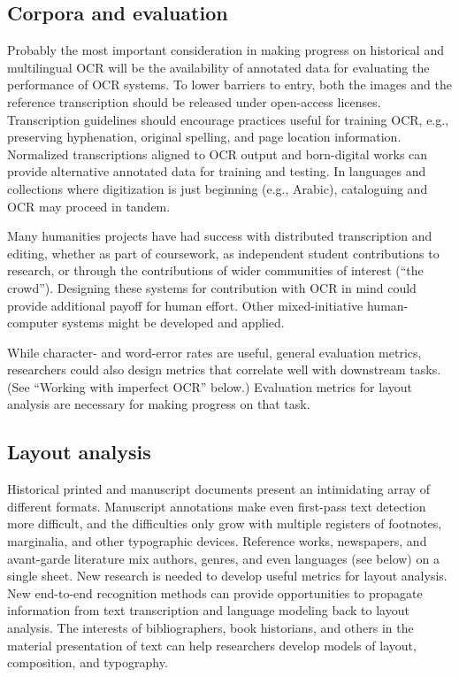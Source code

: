 \documentclass[twoside,11pt]{report}
\begin{document}
\subsection{Corpora and evaluation}

Probably the most important consideration in making progress on historical and multilingual OCR will be the availability of annotated data for evaluating the performance of OCR systems. To lower barriers to entry, both the images and the reference transcription should be released  under open-access licenses. Transcription guidelines should encourage practices useful for training OCR, e.g., preserving hyphenation, original spelling, and page location information. Normalized transcriptions aligned to OCR output and born-digital works can provide alternative annotated data for training and testing. In languages and collections where digitization is just beginning (e.g., Arabic), cataloguing and OCR may proceed in tandem.

Many humanities projects have had success with distributed transcription and editing, whether as part of coursework, as independent student contributions to research, or through the contributions of wider communities of interest (``the crowd''). Designing these systems for contribution with OCR in mind could provide additional payoff for human effort. Other mixed-initiative human-computer systems might be developed and applied.

While character- and word-error rates are useful, general evaluation metrics, researchers could also design metrics that correlate well with downstream tasks. (See ``Working with imperfect OCR'' below.) Evaluation metrics for layout analysis are necessary for making progress on that task.

\subsection{Layout analysis}

Historical printed and manuscript documents present an intimidating array of different formats. Manuscript annotations make even first-pass text detection more difficult, and the difficulties only grow with multiple registers of footnotes, marginalia, and other typographic devices. Reference works, newspapers, and avant-garde literature mix authors, genres, and even languages (see below) on a single sheet. New research is needed to develop useful metrics for layout analysis. New end-to-end recognition methods can provide opportunities to propagate information from text transcription and language modeling back to layout analysis. The interests of bibliographers, book historians, and others in the material presentation of text can help researchers develop models of layout, composition, and typography.
\end{document}
